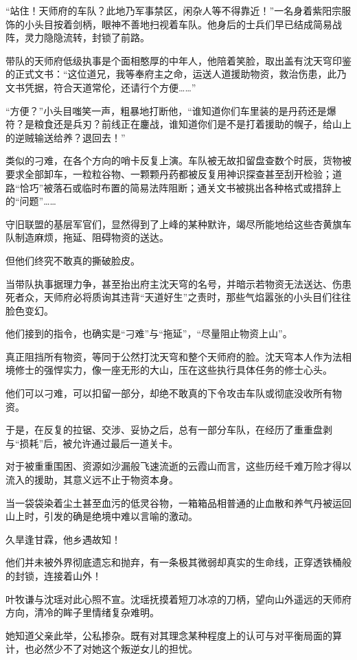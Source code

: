“站住！天师府的车队？此地乃军事禁区，闲杂人等不得靠近！”一名身着紫阳宗服饰的小头目按着剑柄，眼神不善地扫视着车队。他身后的士兵们早已结成简易战阵，灵力隐隐流转，封锁了前路。

带队的天师府低级执事是个面相憨厚的中年人，他陪着笑脸，取出盖有沈天穹印鉴的正式文书：“这位道兄，我等奉府主之命，运送人道援助物资，救治伤患，此乃文书凭据，符合天道常伦，还请行个方便……”

“方便？”小头目嗤笑一声，粗暴地打断他，“谁知道你们车里装的是丹药还是爆符？是粮食还是兵刃？前线正在鏖战，谁知道你们是不是打着援助的幌子，给山上的逆贼输送给养？退回去！”

类似的刁难，在各个方向的哨卡反复上演。车队被无故扣留盘查数个时辰，货物被要求全部卸车，一粒粒谷物、一颗颗丹药都被反复用神识探查甚至刮开检验；道路“恰巧”被落石或临时布置的简易法阵阻断；通关文书被挑出各种格式或措辞上的“问题”……

守旧联盟的基层军官们，显然得到了上峰的某种默许，竭尽所能地给这些杏黄旗车队制造麻烦，拖延、阻碍物资的送达。

但他们终究不敢真的撕破脸皮。

当带队执事据理力争，甚至抬出府主沈天穹的名号，并暗示若物资无法送达、伤患死者众，天师府必将质询其违背“天道好生”之责时，那些气焰嚣张的小头目们往往脸色变幻。

他们接到的指令，也确实是“刁难”与“拖延”，“尽量阻止物资上山”。

真正阻挡所有物资，等同于公然打沈天穹和整个天师府的脸。沈天穹本人作为法相境修士的强悍实力，像一座无形的大山，压在这些执行具体任务的修士心头。

他们可以刁难，可以扣留一部分，却绝不敢真的下令攻击车队或彻底没收所有物资。

于是，在反复的拉锯、交涉、妥协之后，总有一部分车队，在经历了重重盘剥与“损耗”后，被允许通过最后一道关卡。

对于被重重围困、资源如沙漏般飞速流逝的云霞山而言，这些历经千难万险才得以流入的援助，其意义远不止于物资本身。

当一袋袋染着尘土甚至血污的低灵谷物，一箱箱品相普通的止血散和养气丹被运回山上时，引发的确是绝境中难以言喻的激动。

久旱逢甘霖，他乡遇故知！

他们并未被外界彻底遗忘和抛弃，有一条极其微弱却真实的生命线，正穿透铁桶般的封锁，连接着山外！

叶牧谦与沈瑶对此心照不宣。沈瑶抚摸着短刀冰凉的刀柄，望向山外遥远的天师府方向，清冷的眸子里情绪复杂难明。

她知道父亲此举，公私掺杂。既有对其理念某种程度上的认可与对平衡局面的算计，也必然少不了对她这个叛逆女儿的担忧。

